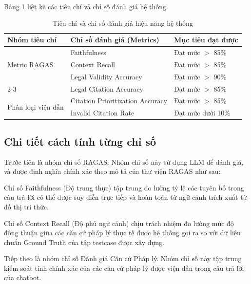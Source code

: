 \documentclass[../DoAn.tex]{subfiles}
\begin{document}
Bảng \ref{table:testing_metrics} liệt kê các tiêu chí vả chỉ số đánh giá hệ thống.
\begin{table}[H]
\centering
\caption{Tiêu chí và chỉ số đánh giá hiệu năng hệ thống}
\label{table:testing_metrics}
\begin{tabular}{|l|l|p{4cm}|}
\hline
\textbf{Nhóm tiêu chí} & \textbf{Chỉ số đánh giá (Metrics)} & \textbf{Mục tiêu đạt được} \\ \hline
\multirow{3}{*}{Metric RAGAS} & Faithfulness & Đạt mức $>$ 85\% \\ \cline{2-3} 
& Context Recall & Đạt mức $>$ 85\% \\ \hline
\multirow{2}{*}{Căn cứ pháp lý} & Legal Validity Accuracy & Đạt mức $>$ 90\% \\ \cline{2-3} 
 & Legal Citation Accuracy & Đạt mức $>$ 85\% \\ \hline
\multirow{2}{*}{Phân loại viện dẫn} & Citation Prioritization Accuracy & Đạt mức $>$ 85\% \\ \cline{2-3} 
 & Invalid Citation Rate & Đạt mức dưới 10\%  \\ \hline
\end{tabular}
\end{table}

\subsection{Chi tiết cách tính từng chỉ số}
\label{subsection:4.chi_tiet_chi_so}

Trước tiên là nhóm chỉ số RAGAS. Nhóm chỉ số này sử dụng LLM để đánh giá, và được định nghĩa chính xác theo mô tả của thư viện RAGAS như sau:

Chỉ số Faithfulness (Độ trung thực) tập trung đo lường tỷ lệ các tuyên bố trong câu trả lời có thể được suy diễn trực tiếp và hoàn toàn từ ngữ cảnh trích xuất từ đồ thị tri thức.

Chỉ số Context Recall (Độ phủ ngữ cảnh) chịu trách nhiệm đo lường mức độ đồng thuận giữa các căn cứ pháp lý thực tế được hệ thống gọi ra so với dữ liệu chuẩn Ground Truth của tập testcase được xây dựng.

Tiếp theo là nhóm chỉ số Đánh giá Căn cứ Pháp lý. Nhóm chỉ số này tập trung kiểm soát tính chính xác của các căn cứ pháp lý được viện dẫn trong câu trả lời của chatbot.
\end{document}
